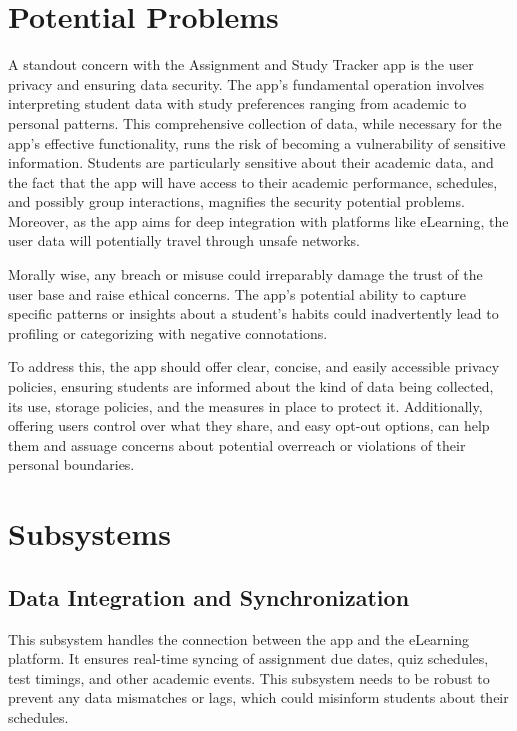 \documentclass[12pt]{article}
\begin{document}
\section{Potential Problems}
    A standout concern with the Assignment and Study Tracker app is the user privacy and ensuring data security. The app's fundamental operation involves interpreting student data with study preferences ranging from academic to personal patterns. This comprehensive collection of data, while necessary for the app's effective functionality, runs the risk of becoming a vulnerability of sensitive information. Students are particularly sensitive about their academic data, and the fact that the app will have access to their academic performance, schedules, and possibly group interactions, magnifies the security potential problems. Moreover, as the app aims for deep integration with platforms like eLearning, the user data will potentially travel through unsafe networks.


     Morally wise, any breach or misuse could irreparably damage the trust of the user base and raise ethical concerns. The app's potential ability to capture specific patterns or insights about a student's habits could inadvertently lead to profiling or categorizing with negative connotations.

     To address this, the app should offer clear, concise, and easily accessible privacy policies, ensuring students are informed about the kind of data being collected, its use, storage policies, and the measures in place to protect it. Additionally, offering users control over what they share, and easy opt-out options, can help them and assuage concerns about potential overreach or violations of their personal boundaries.


\section{Subsystems}

    \subsection{Data Integration and Synchronization}
    This subsystem handles the connection between the app and the eLearning platform. It ensures real-time syncing of assignment due dates, quiz schedules, test timings, and other academic events. This subsystem needs to be robust to prevent any data mismatches or lags, which could misinform students about their schedules.
\end{document}
